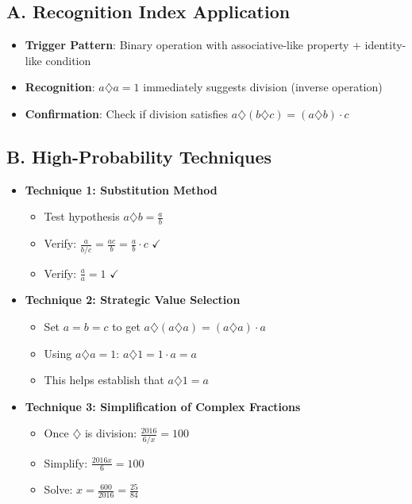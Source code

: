 \documentclass[11pt]{article}
\begin{document}
\begin{conversionbox}
\subsection*{A. Recognition Index Application}
\begin{itemize}[leftmargin=*]
    \item \textbf{Trigger Pattern}: Binary operation with associative-like property + identity-like condition
    \item \textbf{Recognition}: $a \diamondsuit a = 1$ immediately suggests division (inverse operation)
    \item \textbf{Confirmation}: Check if division satisfies $a \diamondsuit (b \diamondsuit c) = (a \diamondsuit b) \cdot c$
\end{itemize}

\subsection*{B. High-Probability Techniques}
\begin{itemize}[leftmargin=*]
    \item \textbf{Technique 1: Substitution Method}
    \begin{itemize}
        \item Test hypothesis $a \diamondsuit b = \frac{a}{b}$
        \item Verify: $\frac{a}{b/c} = \frac{ac}{b} = \frac{a}{b} \cdot c$ $\checkmark$
        \item Verify: $\frac{a}{a} = 1$ $\checkmark$
    \end{itemize}
    
    \item \textbf{Technique 2: Strategic Value Selection}
    \begin{itemize}
        \item Set $a=b=c$ to get $a \diamondsuit (a \diamondsuit a) = (a \diamondsuit a) \cdot a$
        \item Using $a \diamondsuit a = 1$: $a \diamondsuit 1 = 1 \cdot a = a$
        \item This helps establish that $a \diamondsuit 1 = a$
    \end{itemize}
    
    \item \textbf{Technique 3: Simplification of Complex Fractions}
    \begin{itemize}
        \item Once $\diamondsuit$ is division: $\frac{2016}{6/x} = 100$
        \item Simplify: $\frac{2016x}{6} = 100$
        \item Solve: $x = \frac{600}{2016} = \frac{25}{84}$
    \end{itemize}
\end{itemize}


\end{conversionbox}
\end{document}
